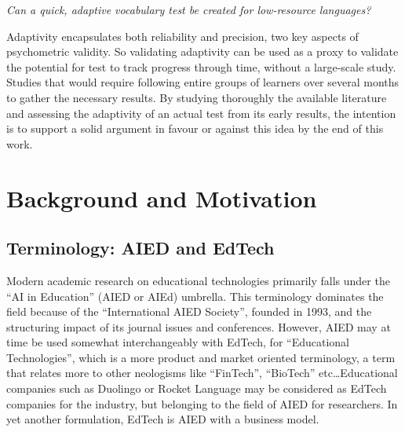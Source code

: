 \textit{Can a quick, adaptive vocabulary test be created for low-resource languages?}

Adaptivity encapsulates both reliability and precision, two key aspects of psychometric validity. So validating adaptivity can be used as a proxy to validate the potential for test to track progress through time, without a large-scale study. Studies that would require following entire groups of learners over several months to gather the necessary results. By studying thoroughly the available literature and assessing the adaptivity of an actual test from its early results, the intention is to support a solid argument in favour or against this idea by the end of this work. 

\section{Background and Motivation}
    \subsection{Terminology: AIED and EdTech}
Modern academic research on educational technologies primarily falls under the ``AI in Education'' (AIED or AIEd) umbrella. This terminology dominates the field because of the ``International AIED Society'', founded in 1993, and the structuring impact of its journal issues and conferences. However, AIED may at time be used somewhat interchangeably with EdTech, for ``Educational Technologies'', which is a more product and market oriented terminology, a term that relates more to other neologisms like ``FinTech'', ``BioTech'' etc\ldots Educational companies such as Duolingo or Rocket Language may be considered as EdTech companies for the industry, but belonging to the field of AIED for researchers. In yet another formulation, EdTech is AIED with a business model.

